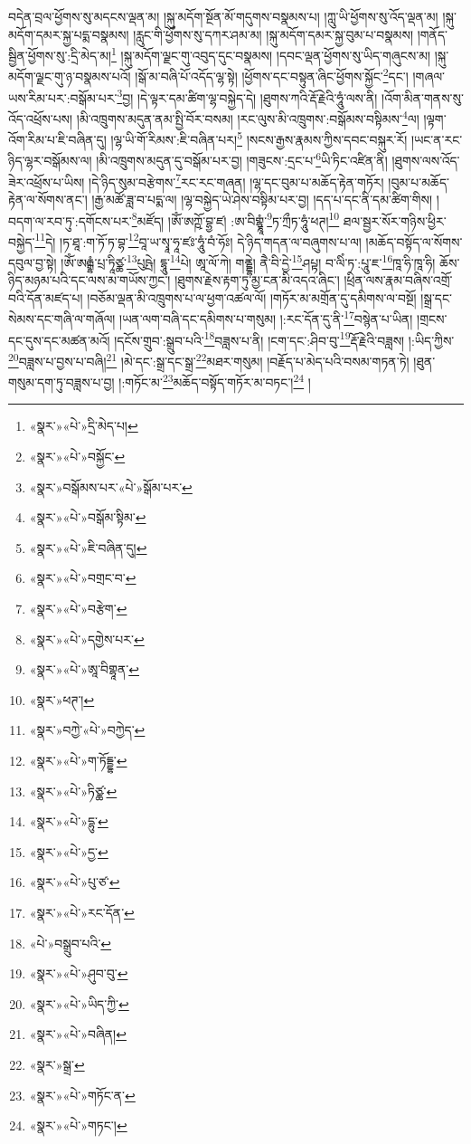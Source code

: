 བདེན་བྲལ་ཕྱོགས་སུ་མདངས་ལྡན་མ། །སྐུ་མདོག་སྔོན་མོ་གདུགས་བསྣམས་པ། །ཀླུ་ཡི་ཕྱོགས་སུ་འོད་ལྡན་མ། །སྐུ་མདོག་དམར་སྐྱ་པདྨ་བསྣམས། །རླུང་གི་ཕྱོགས་སུ་དཀར་ཤམ་མ། །སྐུ་མདོག་དམར་སྐྱ་བུམ་པ་བསྣམས། །གནོད་སྦྱིན་ཕྱོགས་སུ་:དྲི་མེད་མ།\footnote{«སྣར་»«པེ་»དྲི་མེད་པ།} །སྐུ་མདོག་ལྗང་གུ་འབུད་དུང་བསྣམས། །དབང་ལྡན་ཕྱོགས་སུ་ཡིད་གཞུངས་མ། །སྐུ་མདོག་ལྗང་གུ་ཉ་བསྣམས་པའོ། །སྒོ་མ་བཞི་པོ་འདོད་ལྷ་སྟེ། །ཕྱོགས་དང་བསྟུན་ཞིང་ཕྱོགས་སྐྱོང་\footnote{«སྣར་»«པེ་»བསྐྱོང་}དང་། །གཞལ་ཡས་རིམ་པར་:བསྒོམ་པར་\footnote{«སྣར་»བསྒོམས་པར་«པེ་»སྒོམ་པར་}བྱ། །དེ་ལྟར་དམ་ཚིག་ལྷ་བསྐྱེད་དེ། །ཐུགས་ཀའི་རྡོ་རྗེའི་ཧཱུཾ་ལས་ནི། །འོག་མིན་གནས་སུ་འོད་འཕྲོས་པས། །མི་འཁྲུགས་མདུན་ནམ་སྤྱི་བོར་བསམ། །རང་ལུས་མི་འཁྲུགས་:བསྒོམས་བསྟིམས་\footnote{«སྣར་»«པེ་»བསྒོམ་སྟིམ་}ལ། །ལྟག་འོག་རིམ་པ་ཇི་བཞིན་དུ། །ལྷ་ཡི་གོ་རིམས་:ཇི་བཞིན་པར།\footnote{«སྣར་»«པེ་»ཇི་བཞིན་དུ།} །སངས་རྒྱས་རྣམས་ཀྱིས་དབང་བསྐུར་རོ། །ཡང་ན་རང་ཉིད་ལྷར་བསྒོམས་ལ། །མི་འཁྲུགས་མདུན་དུ་བསྒོམ་པར་བྱ། །གཟུངས་:དྲང་པ་\footnote{«སྣར་»«པེ་»བགྲང་བ་}ཡི་ཏིང་འཛིན་ནི། །ཐུགས་ལས་འོད་ཟེར་འཕྲོས་པ་ཡིས། །དེ་ཉིད་སུམ་བརྩེགས་\footnote{«སྣར་»«པེ་»བརྩེག་}རང་རང་གཞན། །ལྷ་དང་བུམ་པ་མཆོད་རྟེན་གཏོར། །བུམ་པ་མཆོད་རྟེན་ལ་སོགས་ནང་། །རྒྱ་མཚོ་ཟླ་བ་པདྨ་ལ། །ལྷ་བསྐྱེད་ཡེ་ཤེས་བསྟིམ་པར་བྱ། །དད་པ་དང་ནི་དམ་ཚིག་གིས། །བདག་ལ་རབ་ཏུ་:དགོངས་པར་\footnote{«སྣར་»«པེ་»དགྱེས་པར་}མཛོད། །ཨོཾ་ཨཀྵོ་བྷྱ་ཛ། :ཨ་བིགྷྣཱཾ་\footnote{«སྣར་»«པེ་»ཨཱ་བིགྷཱན་}ཏ་ཀྲྀཏ་ཧཱུཾ་ཕཊ།\footnote{«སྣར་»ཕཊ་།} ཐལ་སྦྱར་སོར་གཉིས་ཕྱིར་བསྐྱེད་\footnote{«སྣར་»བཀྱེ་«པེ་»བཀྱེད་}དེ། །ཏ་ཐཱ་:ག་ཏོ་ཏ་བྷ་\footnote{«སྣར་»«པེ་»ག་ཏོདྡྷ་}བཱ་ཡ་སྭཱ་ཧཱ་ཛཿ་ཧཱུཾ་བཾ་ཧོཿ། དེ་ཉིད་གདན་ལ་བཞུགས་པ་ལ། །མཆོད་བསྟོད་ལ་སོགས་དབུལ་བྱ་སྟེ། །ཨོཾ་ཨརྒྷཾ་པྲ་ཏཱིཙྪ་\footnote{«སྣར་»«པེ་»ཏིཙྪ་}པུཥྤེ། དྷཱུ་\footnote{«སྣར་»«པེ་»དྷུ་}པེ། ཨཱ་ལོ་ཀེ། གནྡྷེ། ནཻ་བི་དྱེ་\footnote{«སྣར་»«པེ་»དྱ་}ཤཔྟ། བ་ལིཾ་ཏ་:པཱུ་ཇ་\footnote{«སྣར་»«པེ་»པུ་ཙ་}ཁཱ་ཧི་ཁཱ་ཧི། ཆོས་ཉིད་མཉམ་པའི་དང་ལས་མ་གཡོས་ཀྱང་། །ཐུགས་རྗེས་རྟག་ཏུ་མྱ་ངན་མི་འདའ་ཞིང་། །ཕྲིན་ལས་རྣམ་བཞིས་འགྲོ་བའི་དོན་མཛད་པ། །བཅོམ་ལྡན་མི་འཁྲུགས་པ་ལ་ཕྱག་འཚལ་ལོ། །གཏོར་མ་མགྲོན་དུ་དམིགས་ལ་བསྔོ། །སྒྲ་དང་སེམས་དང་གཞི་ལ་གཞོལ། །ཡན་ལག་བཞི་དང་དམིགས་པ་གསུམ། །:རང་དོན་དུ་ནི་\footnote{«སྣར་»«པེ་»རང་དོན་}བསྙེན་པ་ཡིན། །གྲངས་དང་དུས་དང་མཚན་མའོ། །དངོས་གྲུབ་:སྒྲུབ་པའི་\footnote{«པེ་»བསྒྲུབ་པའི་}བཟླས་པ་ནི། །ངག་དང་:ཤིབ་བུ་\footnote{«སྣར་»«པེ་»ཤུབ་བུ་}རྡོ་རྗེའི་བཟླས། །:ཡིད་ཀྱིས་\footnote{«སྣར་»«པེ་»ཡིད་ཀྱི་}བཟླས་པ་བྱས་པ་བཞི།\footnote{«སྣར་»«པེ་»བཞིན།} །མེ་དང་:སྒྲ་དང་སྒྲ་\footnote{«སྣར་»སྒྲ་}མཐར་གསུམ། །བརྗོད་པ་མེད་པའི་བསམ་གཏན་ཏེ། །ཐུན་གསུམ་དག་ཏུ་བཟླས་པ་བྱ། །:གཏོང་མ་\footnote{«སྣར་»«པེ་»གཏོང་ན་}མཆོད་བསྟོད་གཏོར་མ་བཏང་།\footnote{«སྣར་»«པེ་»གཏང་།} །
